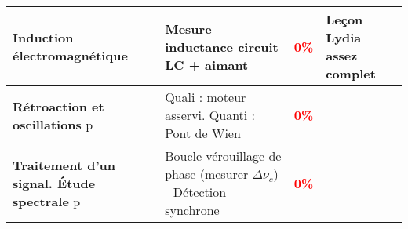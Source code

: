 \begin{changemargin}{-1.5cm}{-0cm}
\begin{center}
\begin{tabularx}{\paperwidth-2cm}{| X | X | c | X |}
  \hline 
  \textbf{Induction électromagnétique} & Mesure inductance circuit LC + aimant & \textcolor{red}{\textbf{0\%}} & Leçon Lydia assez complet\\
  \hline
  \textbf{Rétroaction et oscillations} p\pageref{LP_RetroactionOscillation} & Quali : moteur asservi. Quanti : Pont de Wien & \textcolor{red}{\textbf{0\%}} & \\
  \hline
  \textbf{Traitement d'un signal. Étude spectrale} p\pageref{LP_TraitementSignal} & Boucle vérouillage de phase (mesurer $\Delta \nu_c$) - Détection synchrone & \textcolor{red}{\textbf{0\%}} & \\
  \hline
  
\end{tabularx}
\end{center}






\end{changemargin}
